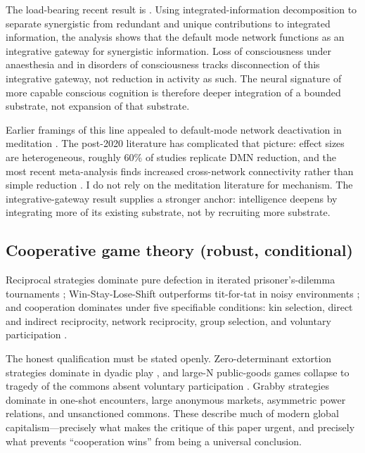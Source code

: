 \documentclass[11pt,twocolumn]{article}
\begin{document}
The load-bearing recent result is \citet{Luppi2024}. Using
integrated-information decomposition to separate synergistic from redundant
and unique contributions to integrated information, the analysis shows
that the default mode network functions as an integrative gateway for
synergistic information. Loss of consciousness under anaesthesia and in
disorders of consciousness tracks disconnection of this integrative
gateway, not reduction in activity as such. The neural signature of more
capable conscious cognition is therefore deeper integration of a bounded
substrate, not expansion of that substrate.

Earlier framings of this line appealed to default-mode network deactivation
in meditation \citep{Brewer2011,Garrison2015}. The post-2020 literature
has complicated that picture: effect sizes are heterogeneous, roughly 60\%
of studies replicate DMN reduction, and the most recent meta-analysis
finds increased cross-network connectivity rather than simple reduction
\citep{VanDam2018,Rahrig2022,Ganesan2022}. I do not rely on the meditation
literature for mechanism. The integrative-gateway result supplies a
stronger anchor: intelligence deepens by integrating more of its existing
substrate, not by recruiting more substrate.

\subsection{Cooperative game theory (robust, conditional)}

Reciprocal strategies dominate pure defection in iterated prisoner's-dilemma
tournaments \citep{Axelrod1984}; Win-Stay-Lose-Shift outperforms
tit-for-tat in noisy environments \citep{NowakSigmund1993}; and cooperation
dominates under five specifiable conditions: kin selection, direct and
indirect reciprocity, network reciprocity, group selection, and voluntary
participation \citep{Nowak2006}.

The honest qualification must be stated openly. Zero-determinant extortion
strategies dominate in dyadic play \citep{PressDyson2012}, and large-N
public-goods games collapse to tragedy of the commons absent voluntary
participation \citep{Hauert2002}. Grabby strategies dominate in one-shot
encounters, large anonymous markets, asymmetric power relations, and
unsanctioned commons. These describe much of modern global capitalism—precisely
what makes the critique of this paper urgent, and precisely what prevents
``cooperation wins'' from being a universal conclusion.
\end{document}
